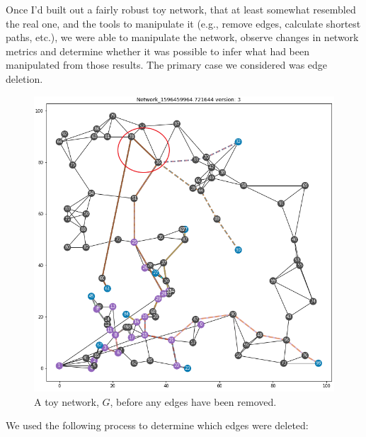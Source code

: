 \documentclass{finalreport}
\begin{document}
Once I'd built out a fairly robust toy network, that at least somewhat resembled the real one, and the tools to manipulate it (e.g., remove edges, calculate shortest paths, etc.), we were able to manipulate the network, observe changes in network metrics and determine whether it was possible to infer what had been manipulated from those results. The primary case we considered was edge deletion.

\begin{figure}[!ht]
\centering
\includegraphics[width=.7\linewidth]{final/OG_78_36.png}
\caption{A toy network, $G$, before any edges have been removed.}
\end{figure}

\noindent We used the following process to determine which edges were deleted:
\end{document}
